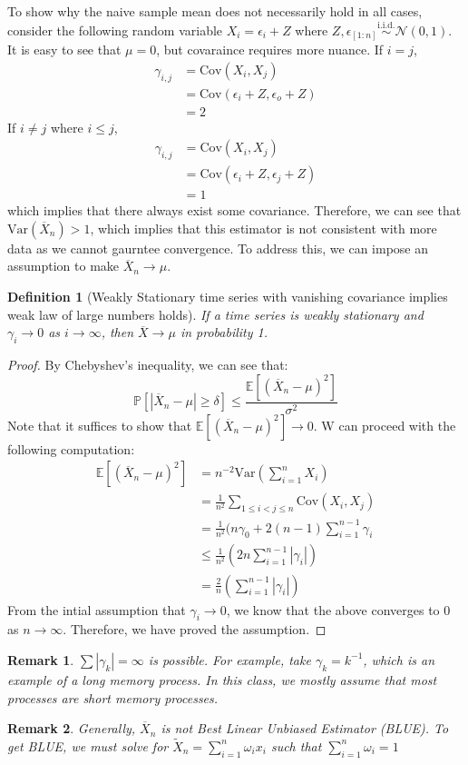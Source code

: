 \documentclass[12pt]{article}
\newtheorem{definition}{Definition}
\newtheorem{remark}{Remark}
\newcommand{\fP}{\mathbb{P}}
\newcommand{\E}{\mathbb{E}}
\newcommand{\Var}{\text{Var}}
\newcommand{\Cov}{\text{Cov}}
\newcommand{\iid}{\overset{\text{i.i.d.}}{\sim}}
\begin{document}
To show why the naive sample mean does not necessarily hold in all cases, consider the following random variable $X_i = \epsilon_i + Z$ where $Z, \epsilon_{[1:n]} \iid \mathcal{N}(0,1)$. It is easy to see that $\mu = 0$, but covaraince requires more nuance. If $i = j$,
\begin{align*}
	\gamma_{i,j} &= \Cov(X_i, X_j) \\
		     &= \Cov(\epsilon_i + Z, \epsilon_o + Z) \\
		     &= 2
\end{align*}
If $i \neq j$ where $i \leq j$, 
\begin{align*}
	\gamma_{i,j} &= \Cov(X_i, X_j) \\
		     &= \Cov(\epsilon_i + Z, \epsilon_j + Z) \\
		     &= 1 
\end{align*}
which implies that there always exist some covariance. Therefore, we can see that $\Var(\overline{X}_n) > 1$, which implies that this estimator is not consistent with more data as we cannot gaurntee convergence. To address this, we can impose an assumption to make $\overline{X}_n \to \mu$. 
\begin{definition}[Weakly Stationary time series with vanishing covariance implies weak law of large numbers holds]
	If a time series is weakly stationary and $\gamma_i \to 0$ as $i \to \infty$, then $\overline{X} \to \mu$ in probability 1. 
\end{definition}
\begin{proof}
By Chebyshev's inequality, we can see that:
\[
	\fP[|\overline{X}_n - \mu| \geq \delta] \leq \frac{\E[(\overline{X}_n - \mu)^2]}{\sigma^2}
\]
Note that it suffices to show that $\E[(\overline{X}_n - \mu)^2] \to 0$. W can proceed with the following computation: 
\begin{align*}
	\E[(\overline{X}_n - \mu)^2] &= n^{-2}\Var\left(\sum_{i = 1}^n X_i\right)\\
				     &= \frac{1}{n^2} \sum_{1 \leq i < j \leq n} \Cov(X_i, X_j)\\
				     &= \frac{1}{n^2}(n\gamma_0 + 2 (n-1)\sum_{i = 1}^{n-1} \gamma_i \\
				     &\leq \frac{1}{n^2}\left(2n \sum_{i=1}^{n-1} |\gamma_i| \right) \\
				     &= \frac{2}{n} \left(\sum_{i=1}^{n-1} |\gamma_i|\right)
\end{align*}
From the intial assumption that $\gamma_i \to 0$, we know that the above converges to 0 as $n \to \infty$. Therefore, we have proved the assumption. 
\end{proof}
\begin{remark}
	$\sum |\gamma_k| = \infty$ is possible. For example, take $\gamma_k = k^{-1}$, which is an example of a long memory process. In this class, we mostly assume that most processes are short memory processes.
\end{remark}
\begin{remark}
	Generally, $\overline{X}_n$ is not Best Linear Unbiased Estimator (BLUE). To get BLUE, we must solve for $\tilde{X}_n = \sum_{i = 1}^n \omega_ix_i $ such that $\sum_{i = 1}^n \omega_i = 1$
\end{remark}
\end{document}
